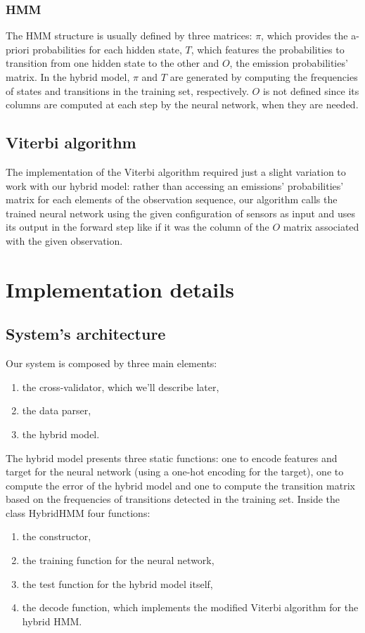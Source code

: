 \documentclass[10pt,a4paper]{article}
\begin{document}
	\subsubsection{HMM}
	The HMM structure is usually defined by three matrices: $\pi$, which provides the a-priori probabilities for each hidden state, $T$, which features the probabilities to transition from one hidden state to the other and  $O$, the emission probabilities' matrix. In the hybrid model, $\pi$ and $T$ are generated by computing the frequencies of states and transitions in the training set, respectively. $O$ is not defined since its columns are computed at each step by the neural network, when they are needed. 
	\subsection{Viterbi algorithm}
	The implementation of the Viterbi algorithm required just a slight variation to work with our hybrid model: rather than accessing an emissions' probabilities' matrix for each elements of the observation sequence, our algorithm calls the trained neural network using the given configuration of sensors as input and uses its output in the forward step like if it was the column of the $O$ matrix associated with the given observation.
	
	\section{Implementation details}
	\subsection{System's architecture}
	Our system is composed by three main elements:
	\begin{enumerate}
		\item the cross-validator, which we'll describe later,
		\item the data parser,
		\item the hybrid model.
	\end{enumerate}
The hybrid model presents three static functions: one to encode features and target for the neural network (using a one-hot encoding for the target), one to compute the error of the hybrid model and one to compute the transition matrix based on the frequencies of transitions detected in the training set. Inside the class HybridHMM four functions:
\begin{enumerate}
	\item the constructor,
	\item the training function for the neural network,
	\item the test function for the hybrid model itself,
	\item the decode function, which implements the modified Viterbi algorithm for the hybrid HMM.
\end{enumerate}
\end{document}
